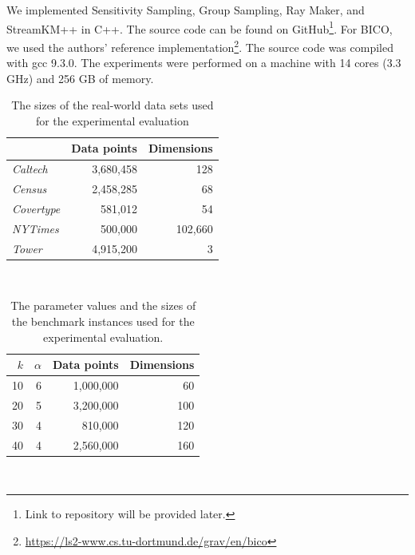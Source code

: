We implemented Sensitivity Sampling, Group Sampling, Ray Maker, and StreamKM++ in C++. The source code can be found on GitHub\footnote{Link to repository will be provided later.}. For BICO, we used the authors' reference implementation\footnote{\url{https://ls2-www.cs.tu-dortmund.de/grav/en/bico}}. The source code was compiled with gcc 9.3.0. The experiments were performed on a machine with 14 cores (3.3 GHz) and 256 GB of memory.





%
\begin{table}
	\begin{center}%
	\caption{The sizes of the real-world data sets used for the experimental evaluation}
	\label{tab:real-world-datasets-overview}
	\begin{tabular}{lrr}
		\toprule
        
		    & Data points
		    & Dimensions
            \\
		\midrule
		\textit{Caltech}
    		& 3,680,458
    		& 128
    		\\
		\textit{Census}
    		& 2,458,285
    		& 68
    		\\
	    \textit{Covertype}
    	    & 581,012
    		& 54
    		\\
	    \textit{NYTimes}
    	    & 500,000
    		& 102,660
    		\\
        \textit{Tower}
            & 4,915,200
    		& 3
    		\\
		\bottomrule
	\end{tabular}\\
	\end{center}
\end{table}



%
\begin{table}
	\begin{center}%
	\caption{The parameter values and the sizes of the benchmark instances used for the experimental evaluation.}
	\label{tab:benchmark-instances-overview}
	\begin{tabular}{rrrr}
		\toprule
        $k$
		    & $\alpha$
		    & Data points
		    & Dimensions
            \\
		\midrule
        10
    		& 6
    		& 1,000,000
    		& 60
    		\\
        20
    		& 5
    		& 3,200,000
    		& 100
    		\\
        30
    		& 4
    		& 810,000
    		& 120
    		\\
        40
    		& 4
    		& 2,560,000
    		& 160
    		\\
		\bottomrule
	\end{tabular}\\
	\end{center}
\end{table}


